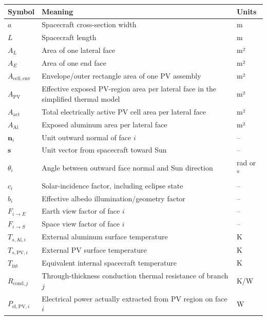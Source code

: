 \documentclass[
]{book}
\newcounter{none} %
\begin{document}
{\def\LTcaptype{none} %
\begin{longtable}[]{@{}
  >{\raggedright\arraybackslash}p{}
  >{\raggedright\arraybackslash}p{}
  >{\raggedright\arraybackslash}p{}@{}}
\toprule\noalign{}
\begin{minipage}[b]{\linewidth}\raggedright
Symbol
\end{minipage} & \begin{minipage}[b]{\linewidth}\raggedright
Meaning
\end{minipage} & \begin{minipage}[b]{\linewidth}\raggedright
Units
\end{minipage} \\
\midrule\noalign{}
\endhead
\bottomrule\noalign{}
\endlastfoot
\(a\) & Spacecraft cross-section width & m \\
\(L\) & Spacecraft length & m \\
\(A_L\) & Area of one lateral face & m² \\
\(A_E\) & Area of one end face & m² \\
\(A_{\mathrm{cell,env}}\) & Envelope/outer rectangle area of one PV assembly & m² \\
\(A_{\mathrm{PV}}\) & Effective exposed PV-region area per lateral face in the simplified thermal model & m² \\
\(A_{\mathrm{act}}\) & Total electrically active PV cell area per lateral face & m² \\
\(A_{\mathrm{Al}}\) & Exposed aluminum area per lateral face & m² \\
\(\mathbf n_i\) & Unit outward normal of face \(i\) & -- \\
\(\mathbf s\) & Unit vector from spacecraft toward Sun & -- \\
\(\theta_i\) & Angle between outward face normal and Sun direction & rad or ° \\
\(c_i\) & Solar-incidence factor, including eclipse state & -- \\
\(b_i\) & Effective albedo illumination/geometry factor & -- \\
\(F_{i\to E}\) & Earth view factor of face \(i\) & -- \\
\(F_{i\to S}\) & Space view factor of face \(i\) & -- \\
\(T_{s,\mathrm{Al},i}\) & External aluminum surface temperature & K \\
\(T_{s,\mathrm{PV},i}\) & External PV surface temperature & K \\
\(T_{\mathrm{int}}\) & Equivalent internal spacecraft temperature & K \\
\(R_{\mathrm{cond},j}\) & Through-thickness conduction thermal resistance of branch \(j\) & K/W \\
\(P_{\mathrm{el,PV},i}\) & Electrical power actually extracted from PV region on face \(i\) & W \\
\end{longtable}
}
\end{document}
